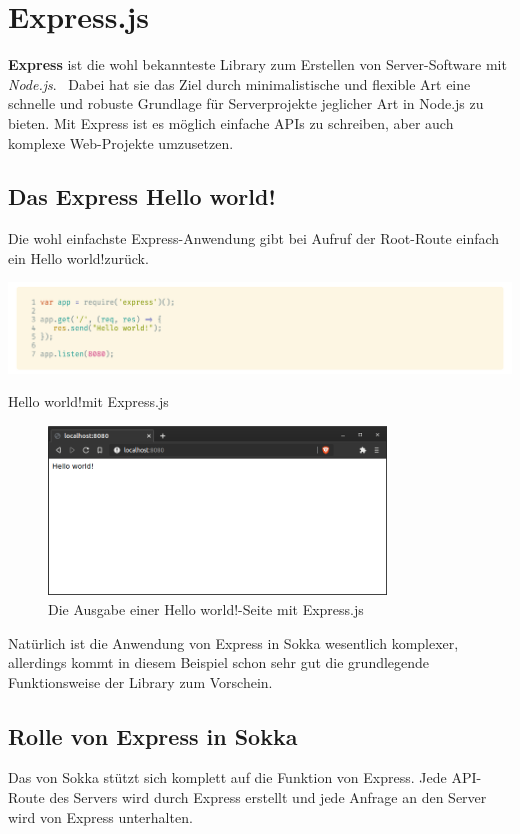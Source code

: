 \section{Express.js}

\textbf{Express} ist die wohl bekannteste Library zum Erstellen von Server-Software mit \textit{Node.js}.~\cite{serby2012} Dabei hat sie das Ziel durch minimalistische und flexible Art eine schnelle und robuste Grundlage für Serverprojekte jeglicher Art in Node.js zu bieten. Mit Express ist es möglich einfache APIs zu schreiben, aber auch komplexe Web-Projekte umzusetzen.

\subsection{Das Express \glqq Hello world!\grqq}

Die wohl einfachste Express-Anwendung gibt bei Aufruf der Root-Route einfach ein \glqq Hello world!\grqq\space zurück.

\begin{code}[htp]
    \begin{center}
        \includegraphics[width=1\textwidth]{images/Dependencies/express.png}
        \vspace{-25pt}
        \caption{\glqq Hello world!\grqq\space mit Express.js}
    \end{center}
\end{code}

\begin{figure}[ht]
    \centering
    \includegraphics[width=0.8\textwidth]{images/Dependencies/helloworld.png}
    \caption{Die Ausgabe einer \glqq Hello world!\grqq -Seite mit Express.js}
\end{figure}

Natürlich ist die Anwendung von Express in Sokka wesentlich komplexer, allerdings kommt in diesem Beispiel schon sehr gut die grundlegende Funktionsweise der Library zum Vorschein.

\subsection{Rolle von Express in Sokka}

Das  von Sokka stützt sich komplett auf die Funktion von Express. Jede API-Route des Servers wird durch Express erstellt und jede Anfrage an den Server wird von Express unterhalten.